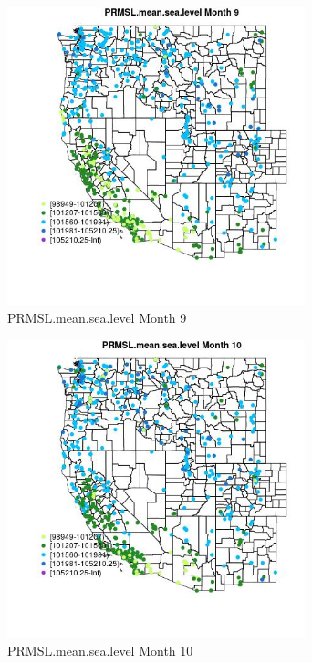 \begin{figure} 
\centering  
\includegraphics[width=0.77\textwidth]{Code_Outputs/Report_ML_input_PM25_Step4_part_e_de_duplicated_aves_compiled_2019-05-14wNAs_MapObsMo9PRMSLmeansealevel.jpg} 
\caption{\label{fig:Report_ML_input_PM25_Step4_part_e_de_duplicated_aves_compiled_2019-05-14wNAsMapObsMo9PRMSLmeansealevel}PRMSL.mean.sea.level Month 9} 
\end{figure} 
 

\clearpage 

\begin{figure} 
\centering  
\includegraphics[width=0.77\textwidth]{Code_Outputs/Report_ML_input_PM25_Step4_part_e_de_duplicated_aves_compiled_2019-05-14wNAs_MapObsMo10PRMSLmeansealevel.jpg} 
\caption{\label{fig:Report_ML_input_PM25_Step4_part_e_de_duplicated_aves_compiled_2019-05-14wNAsMapObsMo10PRMSLmeansealevel}PRMSL.mean.sea.level Month 10} 
\end{figure} 
 


